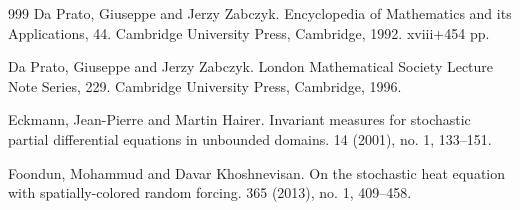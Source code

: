 \documentclass[a4paper,11pt]{article}
\theoremstyle{plain}
\theoremstyle{definition}
\numberwithin{NQ}{section}
\numberwithin{LQ}{section}
\numberwithin{ZQ}{section}
\begin{document}
\begin{small}
\begin{thebibliography}{999}
Da Prato, Giuseppe and Jerzy Zabczyk.
Encyclopedia of Mathematics and its Applications, 44. Cambridge University Press, Cambridge, 1992. xviii+454 pp.

Da Prato, Giuseppe and Jerzy Zabczyk.
\newblock London Mathematical Society Lecture Note Series, 229. Cambridge University Press, Cambridge, 1996. 


Eckmann,  Jean-Pierre and Martin Hairer.
\newblock Invariant measures for stochastic partial differential equations in unbounded domains. 
 14 (2001), no. 1, 133--151. 



%
%

 Foondun, Mohammud and Davar Khoshnevisan.
\newblock On the stochastic heat equation with spatially-colored random forcing.
 365 (2013), no. 1, 409--458.

%
%
%

% 		


\end{thebibliography}
\end{small}
\end{document}
